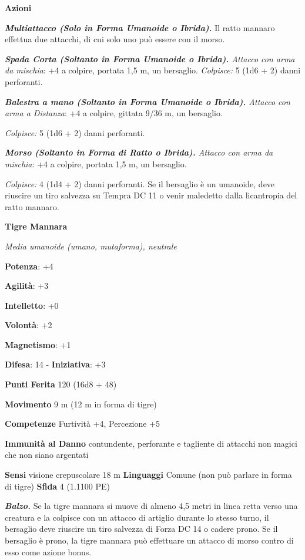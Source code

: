 \begin{multicols}{2}
\textbf{Azioni}

\emph{\textbf{Multiattacco (Solo in Forma Umanoide o Ibrida).}} Il ratto
mannaro effettua due attacchi, di cui solo uno può essere con il morso.

\emph{\textbf{Spada Corta (Soltanto in Forma Umanoide o Ibrida).}
Attacco con arma da mischia}: +4 a colpire, portata 1,5 m, un bersaglio.
\emph{Colpisce:} 5 (1d6 + 2) danni perforanti.

\emph{\textbf{Balestra a mano (Soltanto in Forma Umanoide o Ibrida).}
Attacco con arma a Distanza}: +4 a colpire, gittata 9/36 m, un
bersaglio.

\emph{Colpisce:} 5 (1d6 + 2) danni perforanti.

\emph{\textbf{Morso (Soltanto in Forma di Ratto o Ibrida).} Attacco con
arma da mischia}: +4 a colpire, portata 1,5 m, un bersaglio.

\emph{Colpisce:} 4 (1d4 + 2) danni perforanti. Se il bersaglio è un
umanoide, deve riuscire un tiro salvezza su Tempra DC 11 o venir
maledetto dalla licantropia del ratto mannaro.



\textbf{Tigre Mannara}

\emph{Media umanoide (umano, mutaforma), neutrale}

\textbf{Potenza}: +4

\textbf{Agilità}: +3

\textbf{Intelletto}: +0

\textbf{Volontà}: +2

\textbf{Magnetismo}: +1

\textbf{Difesa}: 14 - \textbf{Iniziativa}: +3

\textbf{Punti Ferita} 120 (16d8 + 48)

\textbf{Movimento} 9 m (12 m in forma di tigre)

\textbf{Competenze} Furtività +4, Percezione +5

\textbf{Immunità al Danno} contundente, perforante e tagliente di
attacchi non magici che non siano argentati

\textbf{Sensi} visione crepuscolare 18 m
\textbf{Linguaggi} Comune (non può parlare in forma di tigre)
\textbf{Sfida} 4 (1.1100 PE)

\emph{\textbf{Balzo.}} Se la tigre mannara si muove di almeno 4,5 metri
in linea retta verso una creatura e la colpisce con un attacco di
artiglio durante lo stesso turno, il bersaglio deve riuscire un tiro
salvezza di Forza DC 14 o cadere prono. Se il bersaglio è prono, la
tigre mannara può effettuare un attacco di morso contro di esso come
azione bonus.


\end{multicols}
